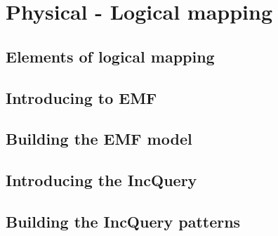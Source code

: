 \section{Physical - Logical mapping}
	\subsection{Elements of logical mapping}
	\subsection{Introducing to EMF}
	\subsection{Building the EMF model}
	\subsection{Introducing the IncQuery}
	\subsection{Building the IncQuery patterns}